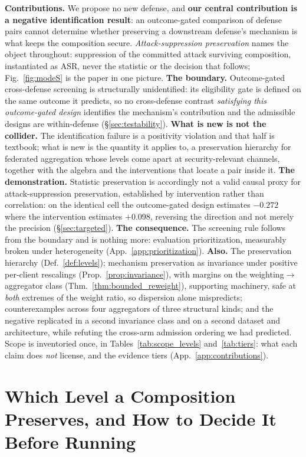 \documentclass{article}
\begin{document}
\noindent\textbf{Contributions.} We propose no new defense, and \textbf{our central contribution is a negative identification result}: an outcome-gated comparison of defense pairs cannot determine whether preserving a downstream defense's mechanism is what keeps the composition secure. \emph{Attack-suppression preservation} names the object throughout: suppression of the committed attack surviving composition, instantiated as ASR, never the statistic or the decision that follows; Fig.~\ref{fig:modeS} is the paper in one picture. \textbf{The boundary.} Outcome-gated cross-defense screening is structurally unidentified: its eligibility gate is defined on the same outcome it predicts, so no cross-defense contrast \emph{satisfying this outcome-gated design} identifies the mechanism's contribution and the admissible designs are within-defense (\S\ref{sec:testability}). \textbf{What is new is not the collider.} The identification failure is a positivity violation and that half is textbook; what is new is the quantity it applies to, a preservation hierarchy for federated aggregation whose levels come apart at security-relevant channels, together with the algebra and the interventions that locate a pair inside it. \textbf{The demonstration.} Statistic preservation is accordingly not a valid causal proxy for attack-suppression preservation, established by intervention rather than correlation: on the identical cell the outcome-gated design estimates $-0.272$ where the intervention estimates $+0.098$, reversing the direction and not merely the precision (\S\ref{sec:targeted}). \textbf{The consequence.} The screening rule follows from the boundary and is nothing more: evaluation prioritization, measurably broken under heterogeneity (App.~\ref{app:prioritization}). \textbf{Also.} The preservation hierarchy (Def.~\ref{def:levels}); mechanism preservation as invariance under positive per-client rescalings (Prop.~\ref{prop:invariance}), with margins on the weighting$\to$aggregator class (Thm.~\ref{thm:bounded_reweight}), supporting machinery, safe at \emph{both} extremes of the weight ratio, so dispersion alone mispredicts; counterexamples across four aggregators of three structural kinds; and the negative replicated in a second invariance class and on a second dataset and architecture, while refuting the cross-arm admission ordering we had predicted. Scope is inventoried once, in Tables~\ref{tab:scope_levels} and~\ref{tab:tiers}: what each claim does \emph{not} license, and the evidence tiers (App.~\ref{app:contributions}).

\section{Which Level a Composition Preserves, and How to Decide It Before Running}
\label{sec:framework}
\end{document}
